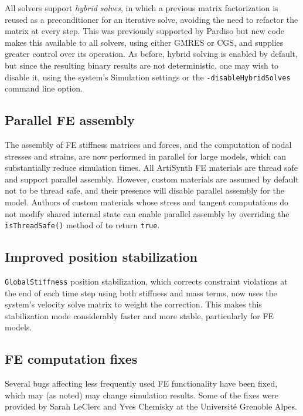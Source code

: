 \documentclass{article}
\begin{document}
All solvers support {\it hybrid solves}, in which a previous matrix
factorization is reused as a preconditioner for an iterative solve,
avoiding the need to refactor the matrix at every step. This was
previously supported by Pardiso but new code makes this available to
all solvers, using either GMRES or CGS, and supplies greater control
over its operation. As before, hybrid solving is enabled by default,
but since the resulting binary results are not deterministic, one may
wish to disable it, using the system's {\sf Simulation} settings or
the {\tt -disableHybridSolves} command line option.

\subsection{Parallel FE assembly}

The assembly of FE stiffness matrices and forces, and the computation of nodal
stresses and strains, are now performed in parallel for large models, which can
substantially reduce simulation times. All ArtiSynth FE materials are thread
safe and support parallel assembly. However, custom materials are assumed by
default not to be thread safe, and their presence will disable parallel
assembly for the model. Authors of custom materials whose stress and tangent
computations do not modify shared internal state can enable parallel assembly
by overriding the {\tt isThreadSafe()} method of
 to return {\tt true}.

\subsection{Improved position stabilization}

{\tt GlobalStiffness} position stabilization, which corrects
constraint violations at the end of each time step using both
stiffness and mass terms, now uses the system's velocity solve matrix
to weight the correction. This makes this stabilization mode
considerably faster and more stable, particularly for FE models.

\subsection{FE computation fixes}

Several bugs affecting less frequently used FE functionality have been
fixed, which may (as noted) may change simulation results.  Some of
the fixes were provided by Sarah LeClerc and Yves Chemisky at the
Universit\'e Grenoble Alpes.
\end{document}

